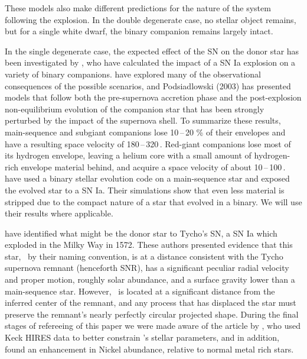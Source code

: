 These models also make different predictions for the nature of the system
following the explosion. In the double degenerate case, no stellar
object remains, but for a single white dwarf, the binary
companion remains largely intact.

In the single degenerate case, the expected effect of the SN on the
donor star has been investigated by \citet*{2000ApJS..128..615M}, who
have calculated the impact of a SN Ia explosion on a variety of binary
companions. \citet*{2001ApJ...550L..53C} have explored many of the
observational consequences of the possible scenarios, and
Podsiadlowski (2003) has presented models that follow both the
pre-supernova accretion phase and the post-explosion non-equilibrium
evolution of the companion star that has been strongly perturbed by
the impact of the supernova shell.  To summarize these results,
main-sequence and subgiant companions lose 10\,--\,20 \% of their
envelopes and have a resulting space velocity of 180\,--\,320\,\kms . Red-giant companions lose most of its hydrogen envelope, leaving a
helium core with a small amount of hydrogen-rich envelope material behind,
and acquire a space velocity of about 10\,--\,100\,\kms.
\citet{2008A&A...489..943P} have used a binary stellar evolution code on a main-sequence star and exposed the evolved star to a SN Ia. Their simulations show that even less material is stripped due to the compact nature of a star that evolved in a binary. We will use their results where applicable. 

\citet[henceforth \rl]{2004Natur.431.1069R} have identified what might
be the donor star to Tycho's SN, a SN Ia which exploded in the Milky
Way in 1572. These authors presented evidence that this star, \starg\
by their naming convention, is at a distance consistent with the Tycho
supernova remnant (henceforth SNR), has a significant peculiar radial
velocity and proper motion, roughly solar abundance, and a surface
gravity lower than a main-sequence star. However, \starg\ is located at a significant distance from the
inferred center of the remnant, and any process that has displaced the
star must preserve the remnant's nearly perfectly circular projected shape. During the final stages of refereeing of this paper we were made aware of the article by \citet[henceforth \gh]{2009ApJ...691....1H}, who used Keck HIRES data to better constrain \starg's stellar parameters, and in addition, found an enhancement in Nickel abundance, relative to normal metal rich stars.

